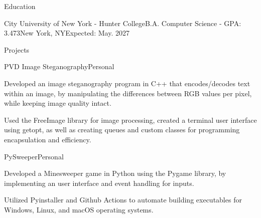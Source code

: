 \documentclass[]{kyvernitis-resume}
\begin{document}
\resumeheader
{}
{}
{}
{}
{}

\begin{section}{Education}
    \begin{subsectionnobullet}{City University of New York - Hunter College}{B.A. Computer Science - GPA: 3.473}{New York, NY}{Expected: May. 2027}
    \end{subsectionnobullet}
\end{section}



\begin{section}{Projects}

\begin{subsectionproject}{PVD Image Steganography}{Personal}{}
    \item{Developed an image steganography program in C++ that encodes/decodes text within an image, by manipulating the differences between RGB values per pixel, while keeping image quality intact.}
    \item{Used the FreeImage library for image processing, created a terminal user interface using getopt, as well as creating queues and custom classes for programming encapsulation and efficiency.}
\end{subsectionproject}

\begin{subsectionproject}{PySweeper}{Personal}{}
    \item{Developed a Minesweeper game in Python using the Pygame library, by implementing an user interface and event handling for inputs.}
    \item{Utilized Pyinstaller and Github Actions to automate building executables for Windows, Linux, and macOS operating systems.}
\end{subsectionproject}

\end{section}

\end{document}
